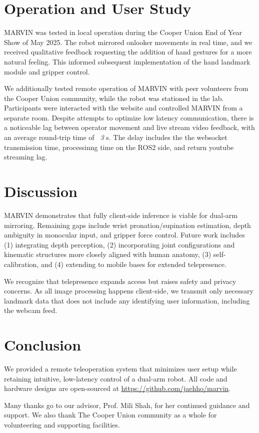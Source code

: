 \documentclass[acmsmall, screen]{acmart}
\begin{document}

\section{Operation and User Study}
MARVIN was tested in local operation during the Cooper Union End of Year Show of May 2025. The robot mirrored onlooker movements in real time, and we received qualitative feedback requesting the addition of hand gestures for a more natural feeling. This informed subsequent implementation of the hand landmark module and gripper control. 

We additionally tested remote operation of MARVIN with peer volunteers from the Cooper Union community, while the robot was stationed in the lab. Participants were interacted with the website and controlled MARVIN from a separate room. Despite attempts to optimize low latency communication, there is a noticeable lag between operator movement and live stream video feedback, with an average round-trip time of \textit{~3} s. The delay includes the the websocket transmission time, processinng time on the ROS2 side, and return youtube streaming lag.

\section{Discussion}
MARVIN demonstrates that fully client-side inference is viable for dual-arm mirroring. Remaining gaps include wrist pronation/supination estimation, depth ambiguity in monocular input, and gripper force control. Future work includes (1) integrating depth perception, (2) incorporating joint configurations and kinematic structures more closely aligned with human anatomy, (3) self-calibration, and (4) extending to mobile bases for extended telepresence.

We recognize that telepresence expands access but raises safety and privacy concerns. As all image processing happens client-side, we transmit only necessary landmark data that does not include any identifying user information, including the webcam feed.

\section{Conclusion}
We provided a remote teleoperation system that minimizes user setup while retaining intuitive, low-latency control of a dual-arm robot. All code and hardware designs are open-sourced at \url{https://github.com/jaehho/marvin}.

\begin{acks}
Many thanks go to our advisor, Prof. Mili Shah, for her continued guidance and support. We also thank The Cooper Union community as a whole for volunteering and supporting facilities.
\end{acks}



\end{document}
